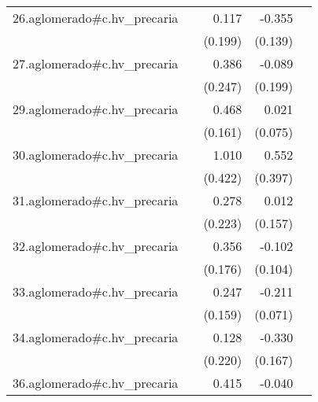 {\begin{longtable}{l*{4}{D{.}{.}{-1}}}
\addlinespace
26.aglomerado#c.hv\_precaria&                     &       0.117         &      -0.355\sym{*}  &                     \\
            &                     &     (0.199)         &     (0.139)         &                     \\
\addlinespace
27.aglomerado#c.hv\_precaria&                     &       0.386         &      -0.089         &                     \\
            &                     &     (0.247)         &     (0.199)         &                     \\
\addlinespace
29.aglomerado#c.hv\_precaria&                     &       0.468\sym{**} &       0.021         &                     \\
            &                     &     (0.161)         &     (0.075)         &                     \\
\addlinespace
30.aglomerado#c.hv\_precaria&                     &       1.010\sym{*}  &       0.552         &                     \\
            &                     &     (0.422)         &     (0.397)         &                     \\
\addlinespace
31.aglomerado#c.hv\_precaria&                     &       0.278         &       0.012         &                     \\
            &                     &     (0.223)         &     (0.157)         &                     \\
\addlinespace
32.aglomerado#c.hv\_precaria&                     &       0.356\sym{*}  &      -0.102         &                     \\
            &                     &     (0.176)         &     (0.104)         &                     \\
\addlinespace
33.aglomerado#c.hv\_precaria&                     &       0.247         &      -0.211\sym{**} &                     \\
            &                     &     (0.159)         &     (0.071)         &                     \\
\addlinespace
34.aglomerado#c.hv\_precaria&                     &       0.128         &      -0.330\sym{*}  &                     \\
            &                     &     (0.220)         &     (0.167)         &                     \\
\addlinespace
36.aglomerado#c.hv\_precaria&                     &       0.415         &      -0.040         &                     \\

\end{longtable}}
